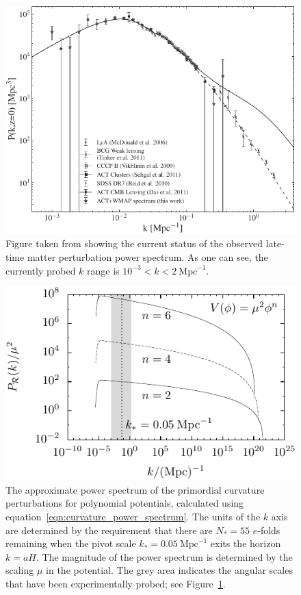 %
\begin{figure}[ht]
  \centering
  \includegraphics[width=\textwidth]{chapter_kinetic_dominance/figures/powerspec}
  \caption{Figure taken from \protect\citet{hlozek_atacama_2012} showing the current status of the observed late-time matter perturbation power spectrum. As one can see, the currently probed $k$ range is $10^{-3}<k<2\:\mathrm{Mpc}^{-1}$.\label{fig:experimental_power_spectrum}}
\end{figure}
%

%
\begin{figure}[ht]
  \includegraphics[width=\textwidth]{chapter_kinetic_dominance/figures/CSpol}
  \caption{The approximate power spectrum of the primordial curvature perturbations for polynomial potentials, calculated using equation~\protect\eqref{eqn:curvature_power_spectrum}. The units of the $k$ axis are determined by the requirement that there are $N_*=55$ $e$-folds remaining when the pivot scale $k_*=0.05\:\mathrm{Mpc}^{-1}$ exits the horizon $k=aH$. The magnitude of the power spectrum is determined by the scaling $\mu$ in the potential. The grey area indicates the angular scales that have been experimentally probed; see Figure~\protect\ref{fig:experimental_power_spectrum}.\label{fig:figure_CSpol}}
\end{figure}
%

